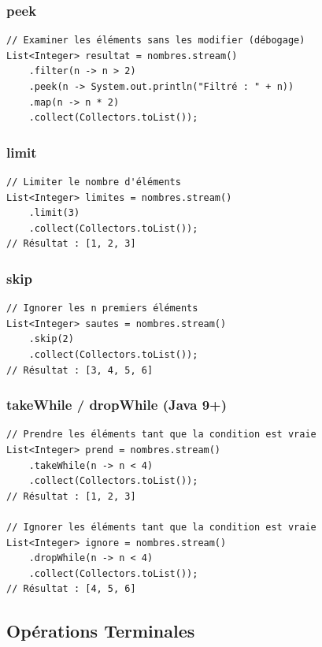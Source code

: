 \documentclass[11pt,a4paper]{article}
\begin{document}
\subsubsection{peek}

\begin{lstlisting}
// Examiner les éléments sans les modifier (débogage)
List<Integer> resultat = nombres.stream()
    .filter(n -> n > 2)
    .peek(n -> System.out.println("Filtré : " + n))
    .map(n -> n * 2)
    .collect(Collectors.toList());
\end{lstlisting}

\subsubsection{limit}

\begin{lstlisting}
// Limiter le nombre d'éléments
List<Integer> limites = nombres.stream()
    .limit(3)
    .collect(Collectors.toList());
// Résultat : [1, 2, 3]
\end{lstlisting}

\subsubsection{skip}

\begin{lstlisting}
// Ignorer les n premiers éléments
List<Integer> sautes = nombres.stream()
    .skip(2)
    .collect(Collectors.toList());
// Résultat : [3, 4, 5, 6]
\end{lstlisting}

\subsubsection{takeWhile / dropWhile (Java 9+)}

\begin{lstlisting}
// Prendre les éléments tant que la condition est vraie
List<Integer> prend = nombres.stream()
    .takeWhile(n -> n < 4)
    .collect(Collectors.toList());
// Résultat : [1, 2, 3]

// Ignorer les éléments tant que la condition est vraie
List<Integer> ignore = nombres.stream()
    .dropWhile(n -> n < 4)
    .collect(Collectors.toList());
// Résultat : [4, 5, 6]
\end{lstlisting}

\subsection{Opérations Terminales}
\end{document}
